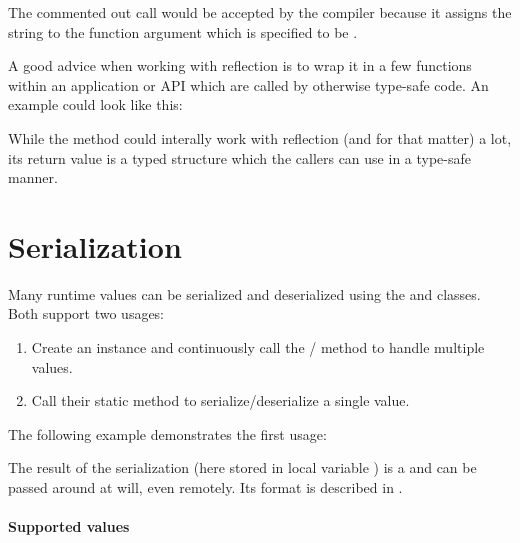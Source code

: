 
The commented out call would be accepted by the compiler because it assigns the string  to the function argument  which is specified to be .

A good advice when working with reflection is to wrap it in a few functions within an application or API which are called by otherwise type-safe code. An example could look like this:


While the method  could interally work with reflection (and  for that matter) a lot, its return value is a typed structure which the callers can use in a type-safe manner.


\section{Serialization}
\label{std-serialization}

Many runtime values can be serialized and deserialized using the  and  classes. Both support two usages:

\begin{enumerate}
	\item Create an instance and continuously call the / method to handle multiple values.
	\item Call their static  method to serialize/deserialize a single value.
\end{enumerate}

The following example demonstrates the first usage:


The result of the serialization (here stored in local variable ) is a  and can be passed around at will, even remotely. Its format is described in .

\paragraph{Supported values}

